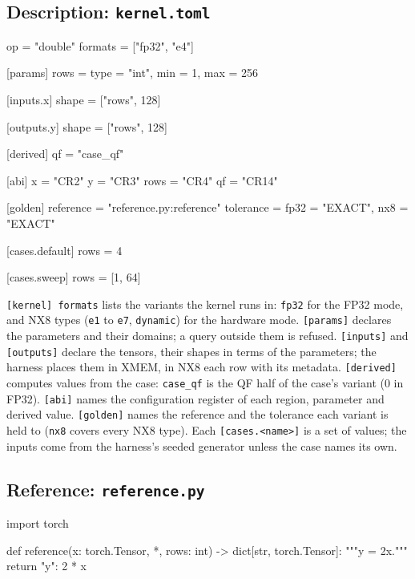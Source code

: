 \documentclass[11pt,a4paper]{article}
\begin{document}
\subsection{Description: \texttt{kernel.toml}}

\begin{pycode}
[kernel]
op = "double"
formats = ["fp32", "e4"]

[params]
rows = { type = "int", min = 1, max = 256 }

[inputs.x]
shape = ["rows", 128]

[outputs.y]
shape = ["rows", 128]

[derived]
qf = "case_qf"

[abi]
x    = "CR2"
y    = "CR3"
rows = "CR4"
qf   = "CR14"

[golden]
reference = "reference.py:reference"
tolerance = { fp32 = "EXACT", nx8 = "EXACT" }

[cases.default]
rows = 4

[cases.sweep]
rows = [1, 64]
\end{pycode}

\texttt{[kernel] formats} lists the variants the kernel runs in: \texttt{fp32}
for the FP32 mode, and NX8 types (\texttt{e1} to \texttt{e7},
\texttt{dynamic}) for the hardware mode. \texttt{[params]} declares the
parameters and their domains; a query outside them is refused.
\texttt{[inputs]} and \texttt{[outputs]} declare the tensors, their shapes in
terms of the parameters; the harness places them in XMEM, in NX8 each row with
its metadata. \texttt{[derived]} computes values from the case:
\texttt{case\_qf} is the QF half of the case's variant (0 in FP32).
\texttt{[abi]} names the configuration register of each region, parameter and
derived value. \texttt{[golden]} names the reference and the tolerance each
variant is held to (\texttt{nx8} covers every NX8 type). Each
\texttt{[cases.<name>]} is a set of values; the inputs come from the
harness's seeded generator unless the case names its own.

\subsection{Reference: \texttt{reference.py}}

\begin{pycode}
import torch


def reference(x: torch.Tensor, *, rows: int) -> dict[str, torch.Tensor]:
    """y = 2x."""
    return {"y": 2 * x}
\end{pycode}
\end{document}
